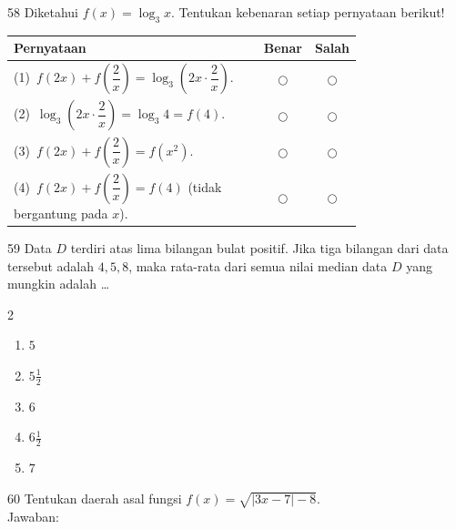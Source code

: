 \documentclass[11pt]{article}
\newenvironment{pilB}{%
  \par\smallskip\begin{multicols}{2}
  \begin{enumerate}[label=(\Alph*),leftmargin=*,itemsep=1pt,topsep=3pt]}%
  {\end{enumerate}\end{multicols}}
\begin{document}
\begin{soal}{58}
Diketahui $f(x)=\log_3 x$.
Tentukan kebenaran setiap pernyataan berikut!

\par\smallskip
{\renewcommand{\arraystretch}{1.4}%
\begin{tabular}{@{}p{0.76\linewidth}cc@{}}
\hline
\textbf{Pernyataan} & \textbf{Benar} & \textbf{Salah}\\
\hline
(1)~$f(2x)+f\!\left(\dfrac{2}{x}\right)=\log_3\!\left(2x\cdot\dfrac{2}{x}\right)$.
  & $\bigcirc$ & $\bigcirc$\\
(2)~$\log_3\!\left(2x\cdot\dfrac{2}{x}\right)=\log_3 4=f(4)$.
  & $\bigcirc$ & $\bigcirc$\\
(3)~$f(2x)+f\!\left(\dfrac{2}{x}\right)=f(x^2)$.
  & $\bigcirc$ & $\bigcirc$\\
(4)~$f(2x)+f\!\left(\dfrac{2}{x}\right)=f(4)$ (tidak bergantung pada $x$).
  & $\bigcirc$ & $\bigcirc$\\
\hline
\end{tabular}}
\end{soal}

\begin{soal}{59}
Data $D$ terdiri atas lima bilangan bulat positif. Jika tiga bilangan
dari data tersebut adalah $4,5,8$, maka rata-rata dari semua nilai
median data $D$ yang mungkin adalah \ldots
\begin{pilB}
  \item $5$ \item $5\tfrac{1}{2}$ \item $6$ \item $6\tfrac{1}{2}$ \item $7$
\end{pilB}
\end{soal}

\begin{soal}{60}
Tentukan daerah asal fungsi $f(x)=\sqrt{|3x-7|-8}$.\\[0.4em]
Jawaban:\enspace\underline{\hspace{7cm}}
\end{soal}
\end{document}
